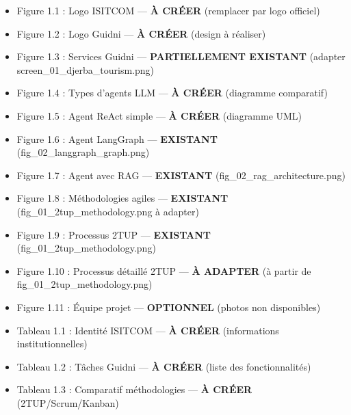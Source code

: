 \documentclass[12pt,a4paper]{article}
\begin{document}
\begin{itemize}
    \item[\textcolor{green}{\checkmark}] Figure 1.1 : Logo ISITCOM — \textbf{À CRÉER} (remplacer par logo officiel)
    \item[\textcolor{green}{\checkmark}] Figure 1.2 : Logo Guidni — \textbf{À CRÉER} (design à réaliser)
    \item[\textcolor{orange}{!}] Figure 1.3 : Services Guidni — \textbf{PARTIELLEMENT EXISTANT} (adapter screen\_01\_djerba\_tourism.png)
    \item[\textcolor{green}{\checkmark}] Figure 1.4 : Types d'agents LLM — \textbf{À CRÉER} (diagramme comparatif)
    \item[\textcolor{green}{\checkmark}] Figure 1.5 : Agent ReAct simple — \textbf{À CRÉER} (diagramme UML)
    \item[\textcolor{green}{\checkmark}] Figure 1.6 : Agent LangGraph — \textbf{EXISTANT} (fig\_02\_langgraph\_graph.png)
    \item[\textcolor{green}{\checkmark}] Figure 1.7 : Agent avec RAG — \textbf{EXISTANT} (fig\_02\_rag\_architecture.png)
    \item[\textcolor{green}{\checkmark}] Figure 1.8 : Méthodologies agiles — \textbf{EXISTANT} (fig\_01\_2tup\_methodology.png à adapter)
    \item[\textcolor{green}{\checkmark}] Figure 1.9 : Processus 2TUP — \textbf{EXISTANT} (fig\_01\_2tup\_methodology.png)
    \item[\textcolor{green}{\checkmark}] Figure 1.10 : Processus détaillé 2TUP — \textbf{À ADAPTER} (à partir de fig\_01\_2tup\_methodology.png)
    \item[\textcolor{red}{\times}] Figure 1.11 : Équipe projet — \textbf{OPTIONNEL} (photos non disponibles)
    
    \item[\textcolor{green}{\checkmark}] Tableau 1.1 : Identité ISITCOM — \textbf{À CRÉER} (informations institutionnelles)
    \item[\textcolor{green}{\checkmark}] Tableau 1.2 : Tâches Guidni — \textbf{À CRÉER} (liste des fonctionnalités)
    \item[\textcolor{green}{\checkmark}] Tableau 1.3 : Comparatif méthodologies — \textbf{À CRÉER} (2TUP/Scrum/Kanban)
\end{itemize}


\end{document}
